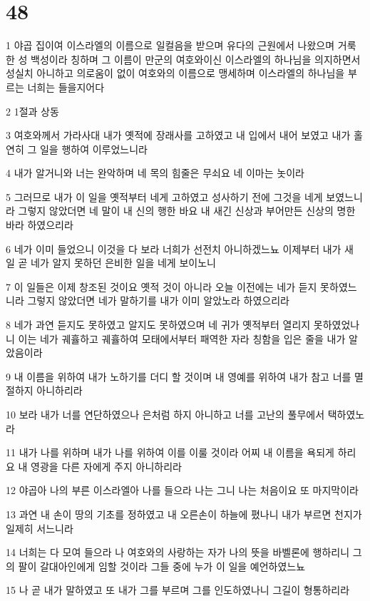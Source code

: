 \chapter{48}

\par 1 야곱 집이여 이스라엘의 이름으로 일컬음을 받으며 유다의 근원에서 나왔으며 거룩한 성 백성이라 칭하며 그 이름이 만군의 여호와이신 이스라엘의 하나님을 의지하면서 성실치 아니하고 의로움이 없이 여호와의 이름으로 맹세하며 이스라엘의 하나님을 부르는 너희는 들을지어다
\par 2 1절과 상동
\par 3 여호와께서 가라사대 내가 옛적에 장래사를 고하였고 내 입에서 내어 보였고 내가 홀연히 그 일을 행하여 이루었느니라
\par 4 내가 알거니와 너는 완악하며 네 목의 힘줄은 무쇠요 네 이마는 놋이라
\par 5 그러므로 내가 이 일을 옛적부터 네게 고하였고 성사하기 전에 그것을 네게 보였느니라 그렇지 않았더면 네 말이 내 신의 행한 바요 내 새긴 신상과 부어만든 신상의 명한 바라 하였으리라
\par 6 네가 이미 들었으니 이것을 다 보라 너희가 선전치 아니하겠느뇨 이제부터 내가 새 일 곧 네가 알지 못하던 은비한 일을 네게 보이노니
\par 7 이 일들은 이제 창조된 것이요 옛적 것이 아니라 오늘 이전에는 네가 듣지 못하였느니라 그렇지 않았더면 네가 말하기를 내가 이미 알았노라 하였으리라
\par 8 네가 과연 듣지도 못하였고 알지도 못하였으며 네 귀가 옛적부터 열리지 못하였었나니 이는 네가 궤휼하고 궤휼하여 모태에서부터 패역한 자라 칭함을 입은 줄을 내가 알았음이라
\par 9 내 이름을 위하여 내가 노하기를 더디 할 것이며 내 영예를 위하여 내가 참고 너를 멸절하지 아니하리라
\par 10 보라 내가 너를 연단하였으나 은처럼 하지 아니하고 너를 고난의 풀무에서 택하였노라
\par 11 내가 나를 위하며 내가 나를 위하여 이를 이룰 것이라 어찌 내 이름을 욕되게 하리요 내 영광을 다른 자에게 주지 아니하리라
\par 12 야곱아 나의 부른 이스라엘아 나를 들으라 나는 그니 나는 처음이요 또 마지막이라
\par 13 과연 내 손이 땅의 기초를 정하였고 내 오른손이 하늘에 폈나니 내가 부르면 천지가 일제히 서느니라
\par 14 너희는 다 모여 들으라 나 여호와의 사랑하는 자가 나의 뜻을 바벨론에 행하리니 그의 팔이 갈대아인에게 임할 것이라 그들 중에 누가 이 일을 예언하였느뇨
\par 15 나 곧 내가 말하였고 또 내가 그를 부르며 그를 인도하였나니 그길이 형통하리라
